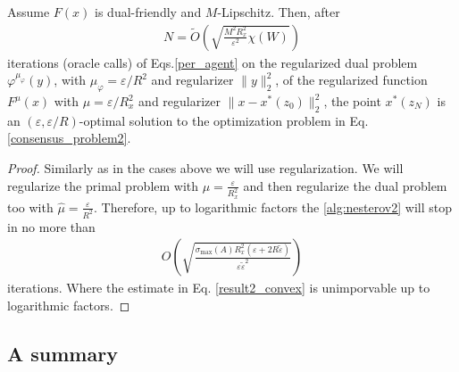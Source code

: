 \documentclass[final]{siamart1116}
\numberwithin{theorem}{section}
\begin{document}
	\begin{theorem}[Case $4$]\label{thm:case4}
		Assume $F(x)$ is dual-friendly and $M$-Lipschitz. Then, after
		\begin{align*}
		N = \tilde O\left( \sqrt{\frac{ M^2R_x^2}{\varepsilon^2} \chi(W)} \right) 
		\end{align*}
		iterations (oracle calls) of Eqs.\cref{per_agent} on the regularized dual problem $\varphi^{\mu_\varphi}(y)$, with $\mu_\varphi = \varepsilon / R^2$ and regularizer $\|y\|_2^2$, of the regularized function $F^\mu(x)$ with $\mu  = \varepsilon / R_x^2$ and regularizer $\|x - x^*(z_0)\|_2^2$, the point $x^*(z_N)$ is an \mbox{$(\varepsilon,\varepsilon/R )$-optimal} solution to the optimization problem in Eq. \eqref{consensus_problem2}.
	\end{theorem}
	\begin{proof}
		Similarly as in the cases above we will use regularization. We will regularize the primal problem with $\mu = \frac{\varepsilon}{R^2_x}$ and then regularize the dual problem too with $\hat{\mu} = \frac{\varepsilon}{R^2}$. Therefore, up to logarithmic factors the \cref{alg:nesterov2} will stop in no more than 
		\begin{align}\label{result2_convex}
		O\left( \sqrt{\frac{\sigma_{\max}(A)R^2_x(\varepsilon+2R\tilde{\varepsilon})}{\varepsilon\tilde\varepsilon^2}}\right)
		\end{align}
		iterations. Where the estimate in Eq. \eqref{result2_convex} is unimporvable up to logarithmic factors.
	\end{proof}
	
	\subsection{A summary}
	
\end{document}
